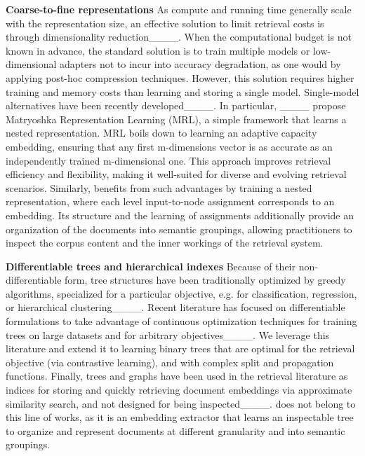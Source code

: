 \noindent\textbf{Coarse-to-fine representations}
As compute and running time generally scale with the representation size, an effective solution to limit retrieval costs is through dimensionality reduction____.
When the computational budget is not known in advance, the standard solution is to train multiple models or low-dimensional adapters not to incur into accuracy degradation, as one would by applying post-hoc compression techniques. However, this solution requires higher training and memory costs than learning and storing a single model.
Single-model alternatives have been recently developed____.
In particular, ____ propose Matryoshka Representation Learning (MRL), a simple framework that learns a nested representation. 
MRL boils down to learning an adaptive capacity embedding, ensuring that any first m-dimensions vector is as accurate as an independently trained m-dimensional one.  
This approach improves retrieval efficiency and flexibility, making it well-suited for diverse and evolving retrieval scenarios.
Similarly, \ourmodel{} benefits from such advantages by training a nested representation, where each level input-to-node assignment corresponds to an embedding. 
Its structure and the learning of assignments additionally provide an organization of the documents into semantic groupings, allowing practitioners to inspect the corpus content and the inner workings of the retrieval system.

\noindent\textbf{Differentiable trees and hierarchical indexes}
Because of their non-differentiable form, tree structures have been traditionally optimized by greedy algorithms, specialized for a particular objective, e.g. for classification, regression, or hierarchical clustering____.
Recent literature has focused on differentiable formulations to take advantage of continuous optimization techniques for training trees on large datasets and for arbitrary objectives____.
We leverage this literature and extend it to learning binary trees that are optimal for the retrieval objective (via contrastive learning), and with complex split and propagation functions.
Finally, trees and graphs have been used in the retrieval literature as indices for storing and quickly retrieving document embeddings via approximate similarity search, and not designed for being inspected____.
\ourmodel{} does not belong to this line of works, as it is an embedding extractor that learns an inspectable tree to organize and represent documents at different granularity and into semantic groupings.